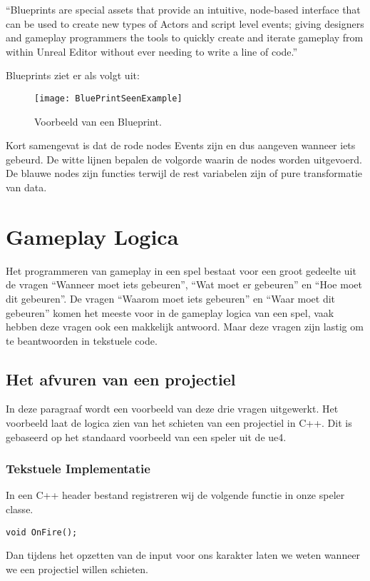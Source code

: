 “Blueprints are special assets that provide an intuitive, node-based interface that can be used to create new types of Actors and script level events; giving designers and gameplay programmers the tools to quickly create and iterate gameplay from within Unreal Editor without ever needing to write a line of code.”

Blueprints ziet er als volgt uit:

\begin{figure}[H]
  \centering
    \texttt{[image: BluePrintSeenExample]}
    \caption{Voorbeeld van een Blueprint.}
\end{figure}

Kort samengevat is dat de rode nodes Events zijn en dus aangeven wanneer iets gebeurd. De witte lijnen bepalen de volgorde waarin de nodes worden uitgevoerd. De blauwe nodes zijn functies terwijl de rest variabelen zijn of pure transformatie van data.

\section{Gameplay Logica}
Het programmeren van gameplay in een spel bestaat voor een groot gedeelte uit de vragen “Wanneer moet iets gebeuren”, “Wat moet er gebeuren” en “Hoe moet dit gebeuren”.
De vragen “Waarom moet iets gebeuren” en “Waar moet dit gebeuren” komen het meeste voor in de gameplay logica van een spel, vaak hebben deze vragen ook een makkelijk antwoord. Maar deze vragen zijn lastig om te beantwoorden in tekstuele code.

\subsection{Het afvuren van een projectiel}
In deze paragraaf wordt een voorbeeld van deze drie vragen uitgewerkt. Het voorbeeld laat de logica zien van het schieten van een projectiel in C++. Dit is gebaseerd op het standaard voorbeeld van een speler uit de \gls{ue4}.

\subsubsection{Tekstuele Implementatie}
In een C++ header bestand registreren wij de volgende functie in onze speler classe.
\begin{lstlisting}[caption=Registratie van de OnFire functie]
void OnFire();
\end{lstlisting}
Dan tijdens het opzetten van de input voor ons karakter laten we weten wanneer we een projectiel willen schieten.

